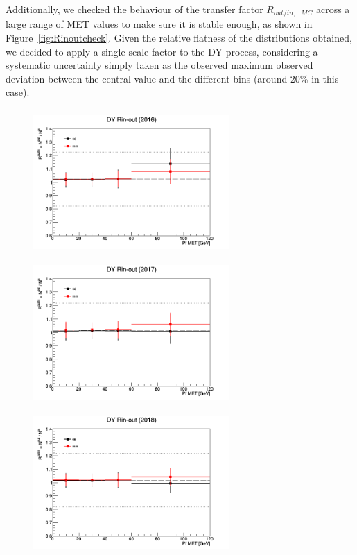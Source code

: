 \documentclass[a4paper, 10pt, openright]{report}
\begin{document}
Additionally, we checked the behaviour of the transfer factor $R_{out/in,\text{ } MC}$ across a large range of \ac{MET} values to make sure it is stable enough, as shown in Figure~\ref{fig:Rinoutcheck}. Given the relative flatness of the distributions obtained, we decided to apply a single scale factor to the \ac{DY} process, considering a systematic uncertainty simply taken as the observed maximum observed deviation between the central value and the different bins (around 20\% in this case).

\begin{figure}[htbp]
\begin{center}
\begin{minipage}[b]{.49\textwidth}
\begin{center}
\includegraphics[width=7.5cm, height=5.6cm]{figs/Rinout2016_data.png}
\end{center}
\end{minipage} \hfill
\begin{minipage}[b]{.49\textwidth}
\begin{center}
\includegraphics[width=7.5cm, height=5.6cm]{figs/Rinout2017_data.png}
\end{center}
\end{minipage} \hfill
\begin{minipage}[b]{.99\textwidth}
\begin{center}
\includegraphics[width=7.5cm, height=5.6cm]{figs/Rinout2018_data.png}

\end{center}
\end{minipage}
\end{center}
\end{figure}
\end{document}

